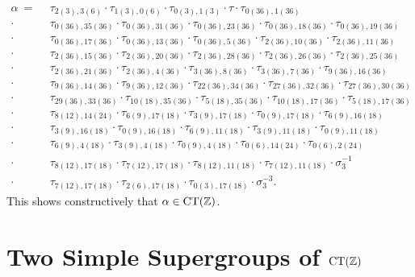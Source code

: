 \documentclass{amsart}
\theoremstyle{definition} \newtheorem{CTZDefinition}{Definition}[section]
\theoremstyle{plain}      \newtheorem{CTZPropertiesTheorem}[CTZDefinition]{Theorem}
\theoremstyle{plain}      \newtheorem{CTZSubgroupsTheorem}[CTZDefinition]{Theorem}
\theoremstyle{definition} \newtheorem{RcwaMappingDefinition}{Definition}[section]
\theoremstyle{definition} \newtheorem{RCWADefinition}[RcwaMappingDefinition]{Definition}
\theoremstyle{plain}      \newtheorem{CTZNotFinitelyGeneratedTheorem}
\theoremstyle{definition} \newtheorem{CTZSmEmbeddingDefinition}[RcwaMappingDefinition]{Definition}
\theoremstyle{plain}      \newtheorem{CTZHighlyTransitiveTheorem}[RcwaMappingDefinition]{Theorem}
\theoremstyle{plain}      \newtheorem{CTZTorsionElementsDivisibleTheorem}
\theoremstyle{plain}      \newtheorem{CTLemma}{Lemma}[section]
\theoremstyle{plain}      \newtheorem{IntegralCommutatorLemma}[CTLemma]{Lemma}
\theoremstyle{plain}      \newtheorem{NormalSubgroupContainsIntegralElementLemma}[CTLemma]{Lemma}
\theoremstyle{plain}      \newtheorem{CTZSimpleTheorem}[CTLemma]{Theorem}
\theoremstyle{remark}     \newtheorem{CTZSimpleRemark}[CTLemma]{Remark}
\theoremstyle{definition} \newtheorem{CTPZDefinition}[CTLemma]{Definition}
\theoremstyle{plain}      \newtheorem{CTPZSimpleCorollary}[CTLemma]{Corollary}
\theoremstyle{plain}      \newtheorem{CTPZSimpleProblem}[CTLemma]{Problem}
\theoremstyle{plain}      \newtheorem{FnPSL2ZEmbeddingTheorem}{Theorem}[section]
\theoremstyle{plain}      \newtheorem{FreeProductEmbeddingTheorem}[FnPSL2ZEmbeddingTheorem]{Theorem}
\theoremstyle{definition} \newtheorem{RestrictionMonomorphismDefinition}
\theoremstyle{plain}      \newtheorem{DirectAndWreathProductsEmbeddingTheorem}
\theoremstyle{plain}      \newtheorem{DirectAndWreathProductsEmbeddingCorollary}
\theoremstyle{definition} \newtheorem{CTintZDefinition}[FnPSL2ZEmbeddingTheorem]{Definition}
\theoremstyle{plain}      \newtheorem{CTintZSimpleTheorem}[FnPSL2ZEmbeddingTheorem]{Theorem}
\theoremstyle{definition} \newtheorem{KernelDefinition}{Definition}[section]
\theoremstyle{definition} \newtheorem{TameWildDefinition}[KernelDefinition]{Definition}
\theoremstyle{definition} \newtheorem{SimpleSupergroupsDefinition}[KernelDefinition]{Definition}
\theoremstyle{definition} \newtheorem{CSCRDefinition}[KernelDefinition]{Definition}
\theoremstyle{plain}      \newtheorem{SimpleSupergroupsGeneratorsTheorem}[KernelDefinition]{Theorem}
\theoremstyle{plain}      \newtheorem{SimpleSupergroupsTheorem}[KernelDefinition]{Theorem}
\theoremstyle{plain}      \newtheorem{SimpleSupergroupsTransitivityTheorem}
\theoremstyle{plain}      \newtheorem{TameGenerationConjecture}[KernelDefinition]{Conjecture}
\theoremstyle{remark}     \newtheorem{TameGenerationRemark}[KernelDefinition]{Remark}
\begin{document}
\begin{align*}
  \alpha \ = \ \ &\tau_{2(3),3(6)} \cdot \tau_{1(3),0(6)}
           \cdot \tau_{0(3),1(3)} \cdot \tau
           \cdot \tau_{0(36),1(36)} \\
           \cdot \ &\tau_{0(36),35(36)} \cdot \tau_{0(36),31(36)}
           \cdot \tau_{0(36),23(36)} \cdot \tau_{0(36),18(36)}
           \cdot \tau_{0(36),19(36)} \\
           \cdot \ &\tau_{0(36),17(36)} \cdot \tau_{0(36),13(36)}
           \cdot \tau_{0(36),5(36)} \cdot \tau_{2(36),10(36)}
           \cdot \tau_{2(36),11(36)} \\
           \cdot \ &\tau_{2(36),15(36)} \cdot \tau_{2(36),20(36)}
           \cdot \tau_{2(36),28(36)} \cdot \tau_{2(36),26(36)}
           \cdot \tau_{2(36),25(36)} \\
           \cdot \ &\tau_{2(36),21(36)} \cdot \tau_{2(36),4(36)}
           \cdot \tau_{3(36),8(36)} \cdot \tau_{3(36),7(36)}
           \cdot \tau_{9(36),16(36)} \\
           \cdot \ &\tau_{9(36),14(36)} \cdot \tau_{9(36),12(36)}
           \cdot \tau_{22(36),34(36)} \cdot \tau_{27(36),32(36)}
           \cdot \tau_{27(36),30(36)} \\
           \cdot \ &\tau_{29(36),33(36)} \cdot \tau_{10(18),35(36)}
           \cdot \tau_{5(18),35(36)} \cdot \tau_{10(18),17(36)}
           \cdot \tau_{5(18),17(36)} \\
           \cdot \ &\tau_{8(12),14(24)} \cdot \tau_{6(9),17(18)}
           \cdot \tau_{3(9),17(18)} \cdot \tau_{0(9),17(18)}
           \cdot \tau_{6(9),16(18)} \\
           \cdot \ &\tau_{3(9),16(18)} \cdot \tau_{0(9),16(18)}
           \cdot \tau_{6(9),11(18)} \cdot \tau_{3(9),11(18)}
           \cdot \tau_{0(9),11(18)} \\
           \cdot \ &\tau_{6(9),4(18)} \cdot \tau_{3(9),4(18)}
           \cdot \tau_{0(9),4(18)} \cdot \tau_{0(6),14(24)}
           \cdot \tau_{0(6),2(24)} \\
           \cdot \ &\tau_{8(12),17(18)} \cdot \tau_{7(12),17(18)}
           \cdot \tau_{8(12),11(18)} \cdot \tau_{7(12),11(18)}
           \cdot \sigma_{3}^{-1} \\
           \cdot \ &\tau_{7(12),17(18)} \cdot \tau_{2(6),17(18)}
           \cdot \tau_{0(3),17(18)} \cdot \sigma_{3}^{-3}.
\end{align*}
This shows constructively that \(\alpha \in \CT{\ZZ}\).

\section{Two Simple Supergroups of \(\CT{\ZZ}\)} \label{SimpleSupergroupsSection}
\end{document}
